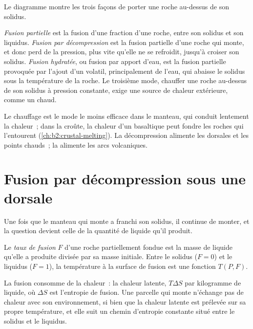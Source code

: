 Le diagramme montre les trois façons de porter une roche au-dessus de son solidus.

\begin{definition}\label{def:b2:mantle-melting:melting}
\emph{Fusion partielle} est la fusion d'une fraction d'une
roche, entre son solidus et son liquidus. \emph{Fusion par
décompression} est la fusion partielle d'une roche qui monte,
et donc perd de la pression, plus vite qu'elle ne se refroidit, jusqu'à croiser son solidus.
\emph{Fusion hydratée},
ou fusion par apport d'eau, est la fusion partielle provoquée par l'ajout d'un volatil,
principalement de l'eau, qui abaisse le solidus sous la température de la roche. Le troisième
mode, chauffer une roche au-dessus de son solidus à pression constante, exige une source
de chaleur extérieure, comme un  chaud.
\end{definition}

Le chauffage est le mode le moins efficace dans le manteau, qui conduit lentement la chaleur~; dans
la croûte, la chaleur d'un  basaltique peut fondre les roches qui l'entourent
(\cref{ch:b2:crustal-melting}). La décompression alimente les dorsales et les points chauds~;
la  alimente les arcs volcaniques.

\section{Fusion par décompression sous une dorsale}\label{sec:b2:mantle-melting:decompression}

Une fois que le manteau qui monte a franchi son solidus, il continue de monter, et la question
devient celle de la quantité de liquide qu'il produit.

\begin{definition}\label{def:b2:mantle-melting:fraction}
Le \emph{taux de fusion} $F$ d'une roche partiellement fondue est
la masse de liquide qu'elle a produite divisée par sa masse initiale. Entre le solidus
($F = 0$) et le liquidus ($F = 1$), la température à la surface de fusion est une
fonction $T(P, F)$.
\end{definition}

La fusion consomme de la chaleur~: la chaleur latente, $T\Delta S$ par kilogramme de liquide, où
$\Delta S$ est l'entropie de fusion. Une parcelle qui monte n'échange pas de chaleur avec son
environnement, si bien que la chaleur latente est prélevée sur sa propre température, et elle
suit un chemin d'entropie constante situé entre le solidus et le liquidus.

